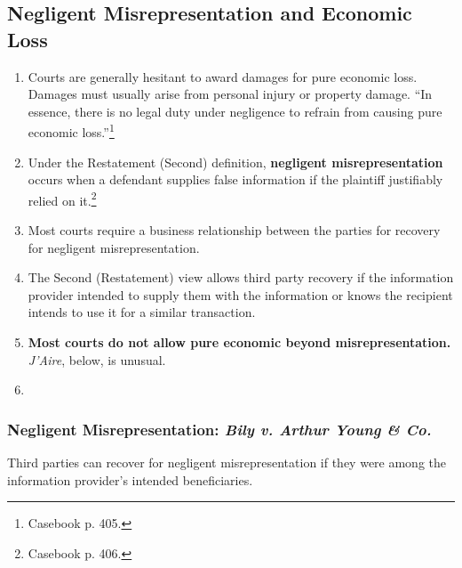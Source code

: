 \subsection{Negligent Misrepresentation and Economic Loss}

\begin{enumerate}
    \item Courts are generally hesitant to award damages for pure economic 
    loss. Damages must usually arise from personal injury or property damage. 
    ``In essence, there is no legal duty under negligence to refrain from 
    causing pure economic loss.''\footnote{Casebook p. 405.}
    \item Under the Restatement (Second) definition, \textbf{negligent 
    misrepresentation} occurs when a defendant supplies false information if 
    the plaintiff justifiably relied on it.\footnote{Casebook p. 406.}
    \item Most courts require a business relationship between the parties for 
    recovery for negligent misrepresentation.
    \item The Second (Restatement) view allows third party recovery if the 
    information provider intended to supply them with the information or knows 
    the recipient intends to use it for a similar transaction.
    \item \textbf{Most courts do not allow pure economic beyond misrepresentation.} 
    \emph{J'Aire}, below, is unusual.
    \item %
\end{enumerate}

\subsubsection{Negligent Misrepresentation: \emph{Bily v. Arthur Young \& 
Co.}}

Third parties can recover for negligent misrepresentation if they were among 
the information provider's intended beneficiaries.

